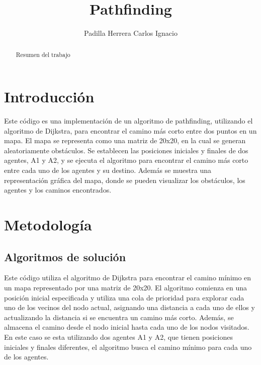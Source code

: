 \documentclass[12pt]{article}
\title{Pathfinding}
\author{Padilla Herrera Carlos Ignacio}
\date{}
\begin{document}
\maketitle

\begin{abstract}
Resumen del trabajo
\end{abstract}

\section{Introducción}
Este código es una implementación de un algoritmo de pathfinding, utilizando el
algoritmo de Dijkstra, para encontrar el camino más corto entre dos puntos en un
mapa. El mapa se representa como una matriz de 20x20, en la cual se generan aleatoriamente
obstáculos. Se establecen las posiciones iniciales y finales de dos agentes, A1 y A2, y se ejecuta
el algoritmo para encontrar el camino más corto entre cada uno de los agentes y su destino. Además
se muestra una representación gráfica del mapa, donde se pueden visualizar los obstáculos, los agentes
y los caminos encontrados.

\section{Metodología}
\subsection{Algoritmos de solución}
Este código utiliza el algoritmo de Dijkstra para encontrar el camino mínimo en un mapa
representado por una matriz de 20x20. El algoritmo comienza en una posición inicial especificada y
utiliza una cola de prioridad para explorar cada uno de los vecinos del nodo actual, asignando una
distancia a cada uno de ellos y actualizando la distancia si se encuentra un camino más corto.
Además, se almacena el camino desde el nodo inicial hasta cada uno de los nodos visitados. En este
caso se esta utilizando dos agentes A1 y A2, que tienen posiciones iniciales y finales diferentes,
el algoritmo busca el camino mínimo para cada uno de los agentes.
\end{document}
